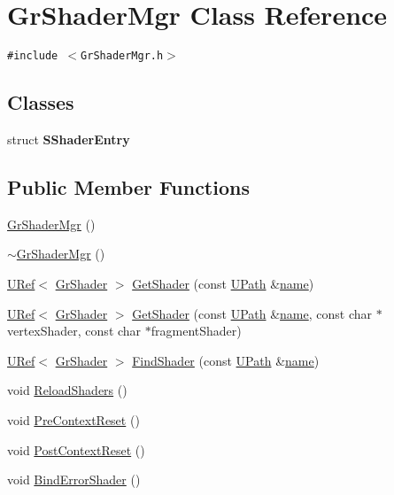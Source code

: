 \hypertarget{class_gr_shader_mgr}{
\section{GrShaderMgr Class Reference}
\label{class_gr_shader_mgr}
}
{\tt \#include $<$GrShaderMgr.h$>$}

\subsection*{Classes}
\begin{CompactItemize}
\item 
struct \textbf{SShaderEntry}
\end{CompactItemize}
\subsection*{Public Member Functions}
\begin{CompactItemize}
\item 
\hyperlink{class_gr_shader_mgr_fe39fc50ee4650c4966fe29225708954}{GrShaderMgr} ()
\item 
\hyperlink{class_gr_shader_mgr_7bd37ffc68abeae00188cb7acfcc5f45}{$\sim$GrShaderMgr} ()
\item 
\hyperlink{class_u_ref}{URef}$<$ \hyperlink{class_gr_shader}{GrShader} $>$ \hyperlink{class_gr_shader_mgr_808c8e1152500a452398977b1b1ff650}{GetShader} (const \hyperlink{class_u_path}{UPath} \&\hyperlink{glext__bak_8h_bb62efe59ccdd153ce42e1a418352209}{name})
\item 
\hyperlink{class_u_ref}{URef}$<$ \hyperlink{class_gr_shader}{GrShader} $>$ \hyperlink{class_gr_shader_mgr_4faff2000dae06eedcfe5c0d355cf4a9}{GetShader} (const \hyperlink{class_u_path}{UPath} \&\hyperlink{glext__bak_8h_bb62efe59ccdd153ce42e1a418352209}{name}, const char $\ast$vertexShader, const char $\ast$fragmentShader)
\item 
\hyperlink{class_u_ref}{URef}$<$ \hyperlink{class_gr_shader}{GrShader} $>$ \hyperlink{class_gr_shader_mgr_995feafb4bceced19755f92e010c002c}{FindShader} (const \hyperlink{class_u_path}{UPath} \&\hyperlink{glext__bak_8h_bb62efe59ccdd153ce42e1a418352209}{name})
\item 
void \hyperlink{class_gr_shader_mgr_ff45e5ef3d72acfa36df2a286c27a954}{ReloadShaders} ()
\item 
void \hyperlink{class_gr_shader_mgr_a7e5765aee3b61abbae8be39ffea63ad}{PreContextReset} ()
\item 
void \hyperlink{class_gr_shader_mgr_2d61b25bed57a4bda589fea72d232d37}{PostContextReset} ()
\item 
void \hyperlink{class_gr_shader_mgr_2478fc2631d56f5e376ecd3a58b0b855}{BindErrorShader} ()
\end{CompactItemize}


